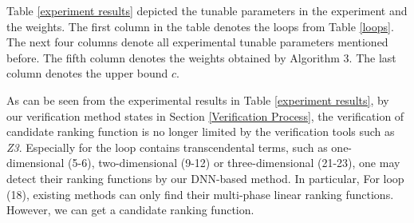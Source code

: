 Table \ref{experiment results} depicted the tunable parameters in the experiment and the weights. The first column in the table denotes the loops from Table \ref{loops}. The next four columns denote all experimental tunable parameters mentioned before. The fifth column denotes the weights obtained by Algorithm 3. The last column denotes the upper bound $c$.

As can be seen from the experimental results in Table \ref{experiment results}, by our verification method states in Section \ref{Verification Process}, the verification of candidate ranking function is no longer limited by the verification tools such as \emph{Z3}. Especially for the loop contains transcendental terms, such as one-dimensional (5-6), two-dimensional (9-12) or three-dimensional (21-23), one may detect their ranking functions by our DNN-based method. In particular, For loop (18), existing methods can only find their multi-phase linear ranking functions. However, we can get a candidate ranking function.

